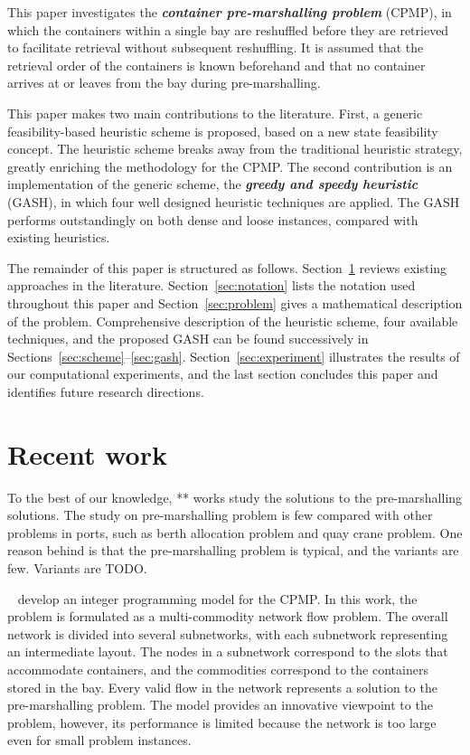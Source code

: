 \documentclass[review,3p,times,12pt,number]{elsarticle}\usepackage{amsmath}\usepackage{amssymb}
\renewcommand{\citet}[1]{\citeauthor{#1}~\citep{#1}}
\renewcommand{\emph}[1]{\textbf{\textit{#1}}}
\begin{document}
This paper investigates the \emph{container pre-marshalling problem} (CPMP), in which the containers within a single bay are reshuffled before they are retrieved to facilitate retrieval without subsequent reshuffling. It is assumed that the retrieval order of the containers is known beforehand and that no container arrives at or leaves from the bay during pre-marshalling.

This paper makes two main contributions to the literature. First, a generic feasibility-based heuristic scheme is proposed, based on a new state feasibility concept. The heuristic scheme breaks away from the traditional heuristic strategy, greatly enriching the methodology for the CPMP\@. The second contribution is an implementation of the generic scheme, the \emph{greedy and speedy heuristic} (GASH), in which four well designed heuristic techniques are applied. The GASH performs outstandingly on both dense and loose instances, compared with existing heuristics.

The remainder of this paper is structured as follows. Section~\ref{sec:literature} reviews existing approaches in the literature. Section~\ref{sec:notation} lists the notation used throughout this paper and Section~\ref{sec:problem} gives a mathematical description of the problem. Comprehensive description of the heuristic scheme, four available techniques, and the proposed GASH can be found successively in Sections~\ref{sec:scheme}--\ref{sec:gash}. Section~\ref{sec:experiment} illustrates the results of our computational experiments, and the last section concludes this paper and identifies future research directions.

\section{Recent work}
\label{sec:literature}

To the best of our knowledge, ** works study the solutions to the pre-marshalling solutions. The study on pre-marshalling problem is few compared with other problems in ports, such as berth allocation problem and quay crane problem. One reason behind is that the pre-marshalling problem is typical, and the variants are few. Variants are TODO.

\citet{lee2007} develop an integer programming model for the CPMP\@. In this work, the problem is formulated as a multi-commodity network flow problem. The overall network is divided into several subnetworks, with each subnetwork representing an intermediate layout. The nodes in a subnetwork correspond to the slots that accommodate containers, and the commodities correspond to the containers stored in the bay. Every valid flow in the network represents a solution to the pre-marshalling problem. The model provides an innovative viewpoint to the problem, however, its performance is limited because the network is too large even for small problem instances.
\end{document}
